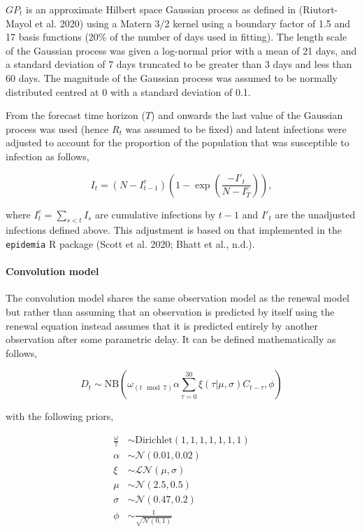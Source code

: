 \documentclass[
]{article}
\begin{document}
\(GP_t\) is an approximate Hilbert space Gaussian process as defined in (Riutort-Mayol et al. 2020) using a Matern 3/2 kernel using a boundary factor of 1.5 and 17 basis functions (20\% of the number of days used in fitting). The length scale of the Gaussian process was given a log-normal prior with a mean of 21 days, and a standard deviation of 7 days truncated to be greater than 3 days and less than 60 days. The magnitude of the Gaussian process was assumed to be normally distributed centred at 0 with a standard deviation of 0.1.

From the forecast time horizon (\(T\)) and onwards the last value of the Gaussian process was used (hence \(R_t\) was assumed to be fixed) and latent infections were adjusted to account for the proportion of the population that was susceptible to infection as follows,

\begin{equation}
    I_t = (N - I^c_{t-1}) \left(1 - \exp \left(\frac{-I'_t}{N - I^c_{T}}\right)\right),
\end{equation}

where \(I^c_t = \sum_{s< t} I_s\) are cumulative infections by \(t-1\) and \(I'_t\) are the unadjusted infections defined above. This adjustment is based on that implemented in the \texttt{epidemia} R package (Scott et al. 2020; Bhatt et al., n.d.).

\hypertarget{convolution-model}{%
\paragraph{Convolution model}\label{convolution-model}}

The convolution model shares the same observation model as the renewal model but rather than assuming that an observation is predicted by itself using the renewal equation instead assumes that it is predicted entirely by another observation after some parametric delay. It can be defined mathematically as follows,

\begin{equation} 
    D_{t} \sim \mathrm{NB}\left(\omega_{(t \mod 7)} \alpha \sum_{\tau = 0}^{30} \xi(\tau | \mu, \sigma) C_{t-\tau},  \phi \right)
\end{equation}

with the following priors,

\begin{align}
    \frac{\omega}{7} &\sim \mathrm{Dirichlet}(1, 1, 1, 1, 1, 1, 1) \\
    \alpha &\sim \mathcal{N}(0.01, 0.02) \\
    \xi &\sim \mathcal{LN}(\mu, \sigma) \\
    \mu &\sim \mathcal{N}(2.5, 0.5) \\
\sigma &\sim \mathcal{N}(0.47, 0.2) \\
\phi &\sim \frac{1}{\sqrt{\mathcal{N}(0, 1)}}
\end{align}
\end{document}
